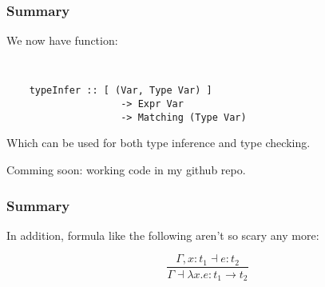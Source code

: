\documentclass{beamer}
\begin{document}
\begin{frame}[fragile]
\frametitle{Summary}
\Large{
We now have  function:

{\tt
\begin{verbatim}
    typeInfer :: [ (Var, Type Var) ]
                    -> Expr Var
                    -> Matching (Type Var)
\end{verbatim}
}

Which can be used for both type inference and type checking.

\vspace{10pt}

Comming soon: working code in my github repo.
}
\end{frame}

\begin{frame}
\frametitle{Summary}
In addition, formula like the following aren't so scary any more:

{\Huge
$$\frac{\Gamma,x:t_1\dashv{}e:t_2}{\Gamma\dashv{}\lambda{}x.e:t_1\rightarrow{}t_2}$$
}
\end{frame}


\end{document}
